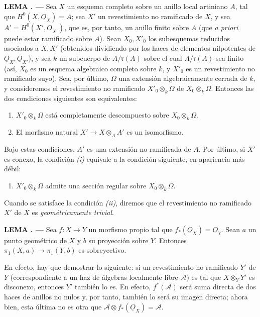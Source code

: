 \documentclass[11pt,twoside,openany]{book}
\numberwithin{equation}{section}
\newcommand{\src}[1]{%
  \phantomsection\hypertarget{src:#1}{}%
  \marginpar{\raggedleft\footnotesize\sffamily #1}%
}
\newcommand{\Osh}{\underline{O}}
\theoremstyle{plain}
\theoremstyle{definition}
\theoremstyle{remark}
\newcommand{\result}[2]{%
  \par\medskip\noindent\textbf{#1%
  \if\relax\detokenize{#2}\relax\else\space#2\fi. ---}\enspace
}
\newcommand{\FgaUnitKey}{frontmatter}
\renewcommand{\src}[1]{%
  \phantomsection\hypertarget{src:\FgaUnitKey:#1}{}%
  \marginpar{\raggedleft\footnotesize\sffamily #1}%
}
\theoremstyle{plain}
\theoremstyle{definition}
\theoremstyle{remark}
\begin{document}
\result{LEMA}{3} Sea $X$ un esquema completo sobre un anillo local artiniano
$A$, tal que $H^0(X,\Osh_X)=A$; sea $X'$ un revestimiento no ramificado de $X$,
y sea $A'=H^0(X',\Osh_{X'})$, que es, por tanto, un anillo finito sobre $A$
(que \textit{a priori} puede estar ramificado sobre $A$). Sean $X_0,X'_0$ los
subesquemas reducidos asociados a $X,X'$ (obtenidos dividiendo por los haces de
elementos nilpotentes de $\Osh_X,\Osh_{X'}$), y sea $k$ un subcuerpo de
$A/\mathfrak r(A)$ sobre el cual $A/\mathfrak r(A)$ sea finito (así, $X_0$ es
un esquema algebraico completo sobre $k$, y $X'_0$ es un revestimiento no
ramificado suyo). Sea, por último, $\Omega$ una extensión algebraicamente
cerrada de $k$, y consideremos el revestimiento no ramificado
$X'_0\otimes_k\Omega$ de $X_0\otimes_k\Omega$. Entonces las dos condiciones
siguientes son equivalentes:
\begin{enumerate}
  \item[\textit{i.}] $X'_0\otimes_k\Omega$ está completamente descompuesto
    sobre $X_0\otimes_k\Omega$.
  \item[\textit{ii.}] El morfismo natural
    $X'\longrightarrow X\otimes_A A'$ es un isomorfismo.
\end{enumerate}
Bajo estas condiciones, $A'$ es una extensión no ramificada de $A$. Por último,
si $X'$ es conexo, la condición \textit{(i)} equivale a la condición siguiente,
en apariencia más débil:
\begin{enumerate}
  \item[\textit{i bis.}] $X'_0\otimes_k\Omega$ admite una sección regular
    sobre $X_0\otimes_k\Omega$.
\end{enumerate}
Cuando se satisface la condición \textit{(ii)}, diremos que el revestimiento no
ramificado $X'$ de $X$ es \emph{geométricamente trivial}.

\src{212}
\result{LEMA}{4} Sea $f:X\longrightarrow Y$ un morfismo propio tal que
$f_*(\Osh_X)=\Osh_Y$. Sean $a$ un punto geométrico de $X$ y $b$ su proyección
sobre $Y$. Entonces $\pi_1(X,a)\longrightarrow\pi_1(Y,b)$ es sobreyectivo.

En efecto, hay que demostrar lo siguiente: si un revestimiento no ramificado
$Y'$ de $Y$ (correspondiente a un haz de álgebras localmente libre
$\mathcal A$) es tal que $X\otimes_Y Y'$ es disconexo, entonces $Y'$ también lo
es. En efecto, $f^*(\mathcal A)$ será suma directa de dos haces de anillos no
nulos y, por tanto, también lo será su imagen directa; ahora bien, esta última
no es otra que $\mathcal A\otimes f_*(\Osh_X)=\mathcal A$.
\end{document}
